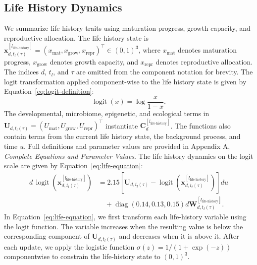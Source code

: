 \documentclass[11pt]{article}
\begin{document}
\subsection{Life History Dynamics}
We summarize life history traits using maturation progress, growth capacity, and reproductive allocation. The life history state is $\mathbf{x}^{[l_{\mathrm{life\text{-}history}}]}_{d,t_l(\tau)}=(x_{\mathrm{mat}},x_{\mathrm{grow}},x_{\mathrm{repr}})^\top\in(0,1)^3$, where $x_{\mathrm{mat}}$ denotes maturation progress, $x_{\mathrm{grow}}$ denotes growth capacity, and $x_{\mathrm{repr}}$ denotes reproductive allocation. The indices $d$, $t_l$, and $\tau$ are omitted from the component notation for brevity. The logit transformation applied component-wise to the life history state is given by Equation~\ref{eq:logit-definition}:
\begin{equation}
\operatorname{logit}(x)
=
\log\frac{x}{1-x}.
\label{eq:logit-definition}
\end{equation}
The developmental, microbiome, epigenetic, and ecological terms in $\mathbf{U}_{d,t_l(\tau)}=(U_{\mathrm{mat}},U_{\mathrm{grow}},U_{\mathrm{repr}})^\top$ instantiate $\mathbf{C}_{d}^{[l_{\mathrm{life\text{-}history}}]}$. The functions also contain terms from the current life history state, the background process, and time $u$. Full definitions and parameter values are provided in Appendix A, \textit{Complete Equations and Parameter Values}. The life history dynamics on the logit scale are given by Equation~\ref{eq:life-equation}:
\begin{equation}
\begin{aligned}
d\,\operatorname{logit}\!\left(
\mathbf{x}^{[l_{\mathrm{life\text{-}history}}]}_{d,t_l(\tau)}
\right)
&=
2.15
\left[
\mathbf{U}_{d,t_l(\tau)}
-
\operatorname{logit}\!\left(
\mathbf{x}^{[l_{\mathrm{life\text{-}history}}]}_{d,t_l(\tau)}
\right)
\right]du
\\
&\quad+
\operatorname{diag}(0.14,0.13,0.15)
d\mathbf{W}^{[l_{\mathrm{life\text{-}history}}]}_{d,t_l(\tau)} .
\end{aligned}
\label{eq:life-equation}
\end{equation}
In Equation~\ref{eq:life-equation}, we first transform each life-history variable using the logit function. The variable increases when the resulting value is below the corresponding component of $\mathbf{U}_{d,t_l(\tau)}$ and decreases when it is above it. After each update, we apply the logistic function $\sigma(z)=1/(1+\exp(-z))$ componentwise to constrain the life-history state to $(0,1)^3$.
\end{document}
